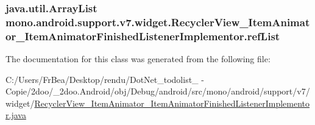 \hypertarget{classmono_1_1android_1_1support_1_1v7_1_1widget_1_1_recycler_view___item_animator___item_animator_finished_listener_implementor_344f55b7c2a70e0e1324a0da8eadb6ac}{
\subsubsection[{refList}]{\setlength{\rightskip}{0pt plus 5cm}java.util.ArrayList {\bf mono.android.support.v7.widget.RecyclerView\_\-ItemAnimator\_\-ItemAnimatorFinishedListenerImplementor.refList}}}
\label{classmono_1_1android_1_1support_1_1v7_1_1widget_1_1_recycler_view___item_animator___item_animator_finished_listener_implementor_344f55b7c2a70e0e1324a0da8eadb6ac}




The documentation for this class was generated from the following file:\begin{CompactItemize}
\item 
C:/Users/FrBea/Desktop/rendu/DotNet\_\-todolist\_ - Copie/2doo/\_\-2doo.Android/obj/Debug/android/src/mono/android/support/v7/widget/\hyperlink{_recycler_view___item_animator___item_animator_finished_listener_implementor_8java}{RecyclerView\_\-ItemAnimator\_\-ItemAnimatorFinishedListenerImplementor.java}\end{CompactItemize}

